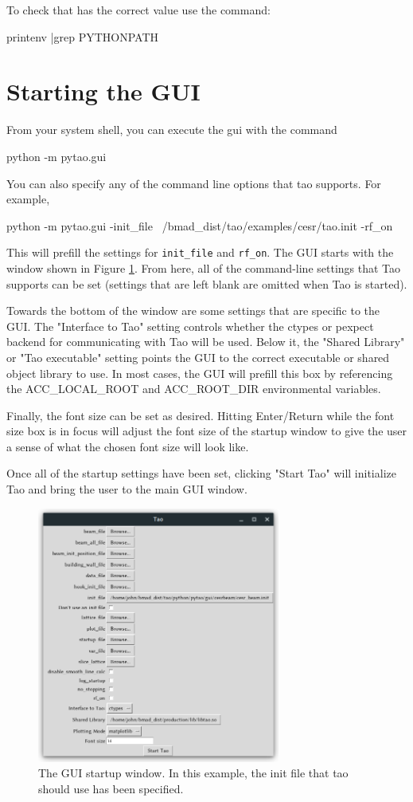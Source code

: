 To check that  has the correct value use the command:
\begin{example}
  printenv |grep PYTHONPATH
\end{example}

\section{Starting the GUI}
\label{s:gui.startup}
From your system shell, you can execute the gui with the command
\begin{example}
  python -m pytao.gui
\end{example}
You can also specify any of the command line options that tao supports.  For example,
\begin{example}
  python -m pytao.gui -init_file ~/bmad_dist/tao/examples/cesr/tao.init -rf_on
\end{example}
This will prefill the settings for \texttt{init_file} and \texttt{rf_on}.
The GUI starts with the window shown in Figure \ref{fig:startup}.
From here, all of the command-line settings that Tao supports can be set (settings that are left blank are omitted when Tao is started).

Towards the bottom of the window are some settings that are specific to the GUI.  The "Interface to Tao" setting controls whether the ctypes or pexpect backend for communicating with Tao will be used.
Below it, the "Shared Library" or "Tao executable" setting points the GUI to the correct executable or shared object library to use.
In most cases, the GUI will prefill this box by referencing the ACC_LOCAL_ROOT and ACC_ROOT_DIR environmental variables.

Finally, the font size can be set as desired.
Hitting Enter/Return while the font size box is in focus will adjust the font size of the startup window to give the user a sense of what the chosen font size will look like.

Once all of the startup settings have been set, clicking "Start Tao" will initialize Tao and bring the user to the main GUI window.
\begin{figure}
\includegraphics[width=8cm]{figures/startup.png}
\centering
\caption{The GUI startup window.  In this example, the init file that tao should use has been specified.}
\label{fig:startup}
\end{figure}

